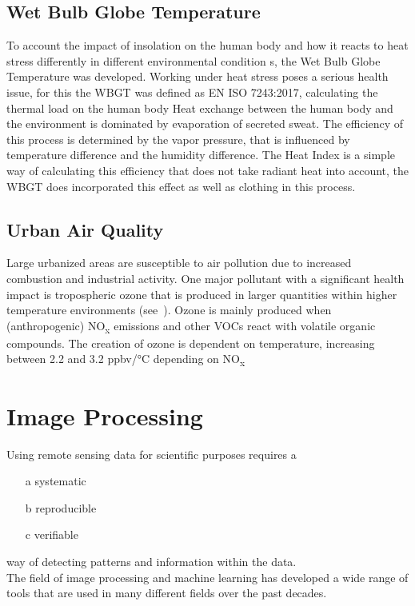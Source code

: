 \documentclass[12pt,a4paper, english]{article}
\begin{document}
    \subsection{Wet Bulb Globe Temperature}
    To account the impact of insolation on the human body and how it reacts to heat stress differently in different environmental condition s, the Wet Bulb Globe Temperature was developed. 
    Working under heat stress poses a serious health issue, for this the \gls{WBGT} was defined as EN ISO 7243:2017, calculating the thermal load on the human body\cite{Iso7243_2017}
    Heat exchange between the human body and the environment is dominated by evaporation of secreted sweat.
    The efficiency of this process is determined by the vapor pressure, that is influenced by temperature difference and the humidity difference. %
    The Heat Index is a simple way of calculating this efficiency that does not take radiant heat into account, the WBGT does incorporated this effect as well as clothing in this process. 
    \subsection{Urban Air Quality}
    Large urbanized areas are susceptible to air pollution due to increased combustion and industrial activity. %
    One major pollutant with a significant health impact is tropospheric ozone that is produced in larger quantities within higher temperature environments (see~\cite{Ebi2008}). 
    Ozone is mainly produced when (anthropogenic) NO\textsubscript{x} emissions and other \glspl{VOC} react with volatile organic compounds. %
    The creation of ozone is dependent on temperature, increasing between 2.2 and 3.2 ppbv/°C depending on NO\textsubscript{x}
\newpage
\section{Image Processing}\label{sec:imgProcessing}
    Using remote sensing data for scientific purposes requires a 
    \begin{itemize} 
      \item[a] systematic
      \item[b] reproducible
      \item[c] verifiable 
    \end{itemize}%
    way of detecting patterns and information within the data. \\
    The field of image processing and machine learning has developed a wide range of tools that are used in many different fields over the past decades. %
\end{document}
